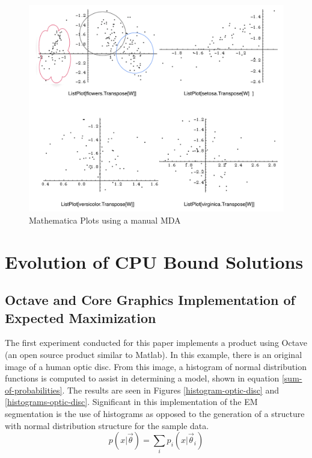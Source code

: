 \documentclass[11pt]{article}
\begin{document}
\begin{figure}[htbp] %
   \centering
   \includegraphics[width=5in]{flowersMDA.pdf} 
   \caption{Mathematica Plots using a manual MDA}
   \label{mathematicaPlotsUsingManualMDA}
\end{figure}

\section{Evolution of CPU Bound Solutions}
\subsection{Octave and Core Graphics Implementation of Expected Maximization}\label{classic-em-implementation}
The first experiment conducted for this paper implements a product using Octave (an open source product similar to Matlab). %
In this example, there is an original image of a human optic disc.  From this image, %
a histogram of normal distribution functions is computed to assist in determining a model, shown in equation \ref{sum-of-probabilities}.  %
The results are seen in Figures \ref{histogram-optic-disc} and \ref{histograms-optic-disc}.  %
Significant in this implementation of the EM segmentation is the use of histograms as opposed to the generation of a structure with normal distribution structure for the sample data. 
\begin{equation}
p(x | \vec{\theta}) = \sum_i p_i(x | \vec{\theta}_i) \label{sum-of-probabilities}
\end{equation}
\end{document}
